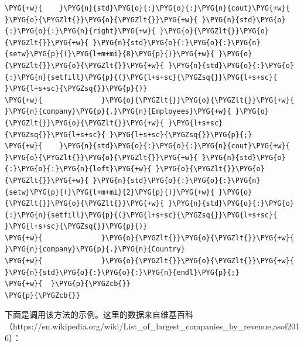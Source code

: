 \begin{itemize}
\begin{codeblockbg}
\begin{Verbatim}[commandchars=\\\{\},breaklines=true,breakanywhere=true,fontsize=\codefont,xleftmargin=17bp]
\PYG{+w}{    }\PYG{n}{std}\PYG{o}{:}\PYG{o}{:}\PYG{n}{cout}\PYG{+w}{ }\PYG{o}{\PYGZlt{}}\PYG{o}{\PYGZlt{}}\PYG{+w}{ }\PYG{n}{std}\PYG{o}{:}\PYG{o}{:}\PYG{n}{right}\PYG{+w}{ }\PYG{o}{\PYGZlt{}}\PYG{o}{\PYGZlt{}}\PYG{+w}{ }\PYG{n}{std}\PYG{o}{:}\PYG{o}{:}\PYG{n}{setw}\PYG{p}{(}\PYG{l+m+mi}{8}\PYG{p}{)}\PYG{+w}{ }\PYG{o}{\PYGZlt{}}\PYG{o}{\PYGZlt{}}\PYG{+w}{ }\PYG{n}{std}\PYG{o}{:}\PYG{o}{:}\PYG{n}{setfill}\PYG{p}{(}\PYG{l+s+sc}{\PYGZsq{}}\PYG{l+s+sc}{ }\PYG{l+s+sc}{\PYGZsq{}}\PYG{p}{)}
\PYG{+w}{              }\PYG{o}{\PYGZlt{}}\PYG{o}{\PYGZlt{}}\PYG{+w}{ }\PYG{n}{company}\PYG{p}{.}\PYG{n}{Employees}\PYG{+w}{ }\PYG{o}{\PYGZlt{}}\PYG{o}{\PYGZlt{}}\PYG{+w}{ }\PYG{l+s+sc}{\PYGZsq{}}\PYG{l+s+sc}{ }\PYG{l+s+sc}{\PYGZsq{}}\PYG{p}{;}
\PYG{+w}{    }\PYG{n}{std}\PYG{o}{:}\PYG{o}{:}\PYG{n}{cout}\PYG{+w}{ }\PYG{o}{\PYGZlt{}}\PYG{o}{\PYGZlt{}}\PYG{+w}{ }\PYG{n}{std}\PYG{o}{:}\PYG{o}{:}\PYG{n}{left}\PYG{+w}{ }\PYG{o}{\PYGZlt{}}\PYG{o}{\PYGZlt{}}\PYG{+w}{ }\PYG{n}{std}\PYG{o}{:}\PYG{o}{:}\PYG{n}{setw}\PYG{p}{(}\PYG{l+m+mi}{2}\PYG{p}{)}\PYG{+w}{ }\PYG{o}{\PYGZlt{}}\PYG{o}{\PYGZlt{}}\PYG{+w}{ }\PYG{n}{std}\PYG{o}{:}\PYG{o}{:}\PYG{n}{setfill}\PYG{p}{(}\PYG{l+s+sc}{\PYGZsq{}}\PYG{l+s+sc}{ }\PYG{l+s+sc}{\PYGZsq{}}\PYG{p}{)}
\PYG{+w}{              }\PYG{o}{\PYGZlt{}}\PYG{o}{\PYGZlt{}}\PYG{+w}{ }\PYG{n}{company}\PYG{p}{.}\PYG{n}{Country}
\PYG{+w}{              }\PYG{o}{\PYGZlt{}}\PYG{o}{\PYGZlt{}}\PYG{+w}{ }\PYG{n}{std}\PYG{o}{:}\PYG{o}{:}\PYG{n}{endl}\PYG{p}{;}
\PYG{+w}{  }\PYG{p}{\PYGZcb{}}
\PYG{p}{\PYGZcb{}}
\end{Verbatim}
\end{codeblockbg}

\end{itemize}



下面是调用该方法的示例。这里的数据来自维基百科（https://\allowbreak{}en.\allowbreak{}wikipedia.\allowbreak{}org/\allowbreak{}wiki/\allowbreak{}List\_\allowbreak{}of\_\allowbreak{}largest\_\allowbreak{}companies\_\allowbreak{}by\_\allowbreak{}revenue,asof2016）：



